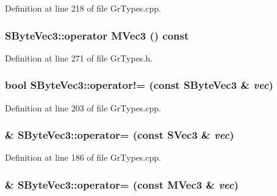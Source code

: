 Definition at line 218 of file GrTypes.cpp.\hypertarget{struct_s_byte_vec3_a4af393753cc8e38c7c7626f6a86d07c}{
\subsubsection[{operator MVec3}]{\setlength{\rightskip}{0pt plus 5cm}SByteVec3::operator {\bf MVec3} () const}}
\label{struct_s_byte_vec3_a4af393753cc8e38c7c7626f6a86d07c}




Definition at line 271 of file GrTypes.h.\hypertarget{struct_s_byte_vec3_c40cf24b6748330b9b70bf2de1534254}{
\subsubsection[{operator!=}]{\setlength{\rightskip}{0pt plus 5cm}bool SByteVec3::operator!= (const {\bf SByteVec3} \& {\em vec})}}
\label{struct_s_byte_vec3_c40cf24b6748330b9b70bf2de1534254}




Definition at line 203 of file GrTypes.cpp.\hypertarget{struct_s_byte_vec3_128ca7dac0e6f8e9d785bc9516048749}{
\subsubsection[{operator=}]{ \& SByteVec3::operator= (const {\bf SVec3} \& {\em vec})}}
\label{struct_s_byte_vec3_128ca7dac0e6f8e9d785bc9516048749}




Definition at line 186 of file GrTypes.cpp.\hypertarget{struct_s_byte_vec3_62a3432f195e528460871140d0660190}{
\subsubsection[{operator=}]{ \& SByteVec3::operator= (const {\bf MVec3} \& {\em vec})}}
\label{struct_s_byte_vec3_62a3432f195e528460871140d0660190}




